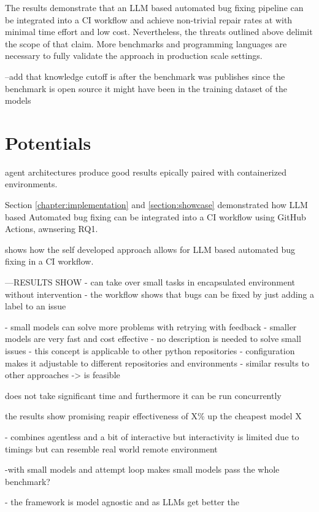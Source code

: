 The results demonstrate that an LLM based automated bug fixing pipeline can be integrated into a CI workflow and achieve non-trivial repair rates at with minimal time effort and low cost.
Nevertheless, the threats outlined above delimit the scope of that claim. More benchmarks and programming languages are necessary to fully validate the approach in production scale settings.

--add that knowledge cutoff is after the benchmark was publishes since the benchmark is open source it might have been in the training dataset of the models

\section{Potentials}

agent architectures produce good results epically paired with containerized environments. \cite{puvvadiCodingAgentsComprehensive2025}

Section \ref{chapter:implementation} and \ref{section:showcase} demonstrated how LLM based Automated bug fixing can be integrated into a CI workflow using GitHub Actions, awnsering RQ1.


shows how the self developed approach allows for LLM based automated bug fixing in a CI workflow.

---RESULTS SHOW
- can take over small tasks in encapsulated environment without intervention
- the workflow shows that bugs can be fixed by just adding a label to an issue

- small models can solve more problems with retrying with feedback
- smaller models are very fast and cost effective
- no description is needed to solve small issues
- this concept is applicable to other python repositories
- configuration makes it adjustable to different repositories and environments
- similar results to other approaches -> is feasible

does not take significant time and furthermore it can be run concurrently

the results show promising reapir effectiveness of X\% up the cheapest model X

- combines agentless and a bit of interactive but interactivity is limited due to timings but can resemble real world remote environment

-with small models and attempt loop makes small models pass the whole benchmark?


- the framework is model agnostic and as LLMs get better the


